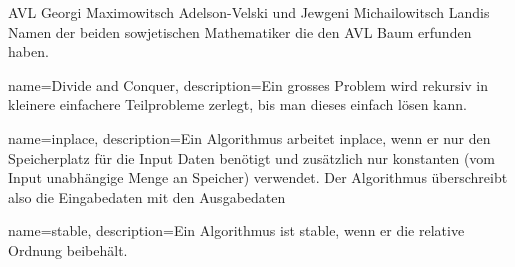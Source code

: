{AVL}
{Georgi Maximowitsch Adelson-Velski und Jewgeni Michailowitsch Landis}
{
	Namen der beiden sowjetischen Mathematiker die den AVL Baum erfunden haben.
}

{
	name={Divide and Conquer},
	description={Ein grosses Problem wird rekursiv in kleinere einfachere Teilprobleme zerlegt, bis man dieses einfach lösen kann.}
}

{
	name={inplace},
	description={Ein Algorithmus arbeitet inplace, wenn er nur den Speicherplatz für die Input Daten benötigt und zusätzlich nur konstanten (vom Input unabhängige Menge an Speicher) verwendet. Der Algorithmus überschreibt also die Eingabedaten mit den Ausgabedaten}
}

{
	name={stable},
	description={Ein Algorithmus ist stable, wenn er die relative Ordnung beibehält.}
}